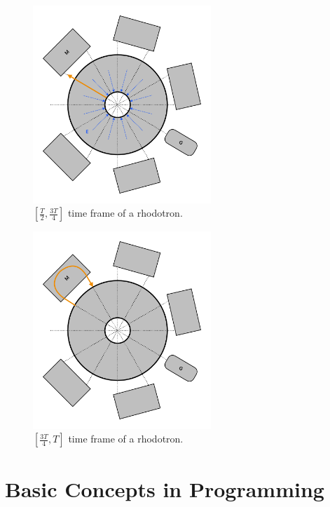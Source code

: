 \documentclass[a4paper,oneside,12pt]{report}
\numberwithin{equation}{chapter}
\begin{document}
\begin{figure}[H]
    \centering
    \includegraphics[width=0.6\textwidth]{./figures/illustrations/rhod3.pdf}
    \caption{$[\frac{T}{2}, \frac{3T}{4}]$ time frame of a rhodotron.}
    \label{fig:rhod_cycle_3}
\end{figure}

\vspace{-50pt}
\begin{figure}[H]
    \centering
    \includegraphics[width=0.6\textwidth]{./figures/illustrations/rhod4.pdf}
    \caption{$[\frac{3T}{4}, T]$ time frame of a rhodotron.}
    \label{fig:rhod_cycle_4}
\end{figure}




\section{Basic Concepts in Programming}
\end{document}
